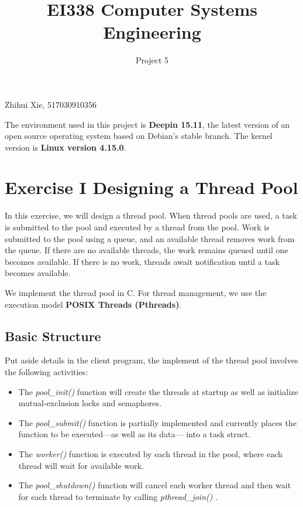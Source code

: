 \documentclass{article}
\title{EI338 Computer Systems Engineering}
\author{Project 5}
\begin{document}
\maketitle

\begin{center}
    Zhihui Xie, 517030910356
\end{center}

The environment used in this project is \textbf{Deepin 15.11}, the latest version of an open source operating system based on Debian's stable branch. The kernel version is \textbf{Linux version 4.15.0}.

\section*{Exercise I Designing a Thread Pool}
In this exercise, we will design a thread pool. When thread pools are used, a
task is submitted to the pool and executed by a thread from the pool. Work is
submitted to the pool using a queue, and an available thread removes work
from the queue. If there are no available threads, the work remains queued
until one becomes available. If there is no work, threads await notification until
a task becomes available.

We implement the thread pool in C. For thread management, we use the execution model \textbf{POSIX Threads (Pthreads)}.

\subsection*{Basic Structure}
Put aside details in the client program, the implement of the thread pool involves the following activities:

\begin{itemize}
    \item The \textit{pool\_init()} function will create the threads at startup as well as initialize mutual-exclusion locks and semaphores.
    \item The \textit{pool\_submit()} function is partially implemented and currently
    places the function to be executed—as well as its data— into a task
    struct.
    \item The \textit{worker()} function is executed by each thread in the pool, where each
    thread will wait for available work.
    \item The \textit{pool\_shutdown()} function will cancel each worker thread and then
    wait for each thread to terminate by calling \textit{pthread\_join()} .
\end{itemize}
\end{document}
